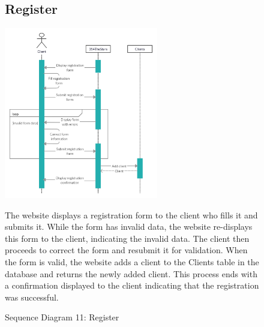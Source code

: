 \documentclass[11pt]{article}
\begin{document}
\begin{figure}[ht!]
    \subsection{Register}
    \centering
    \includegraphics[width=0.6\textwidth,height=0.3\paperheight]{Diagrams/Sequence/Register.jpg}
    \caption{Sequence Diagram 11: Register}
    \label{fig: Register}
    \begin{justify}
        The website displays a registration form to the client who fills it and submits it. While the form has invalid data, the website re-displays this form to the client, indicating the invalid data. The client then proceeds to correct the form and resubmit it for validation. When the form is valid, the website adds a client to the Clients table in the database and returns the newly added client. This process ends with a confirmation displayed to the client indicating that the registration was successful.
    \end{justify}
\end{figure}
\end{document}
